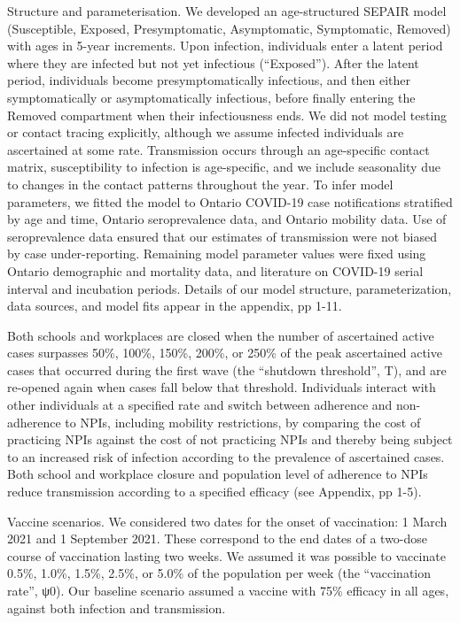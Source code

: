 Structure and parameterisation.  We developed an age-structured SEPAIR model (Susceptible, Exposed, Presymptomatic, Asymptomatic, Symptomatic, Removed) with ages in 5-year increments. Upon infection, individuals enter a latent period where they are infected but not yet infectious (“Exposed”).  After the latent period, individuals become presymptomatically infectious, and then either symptomatically or asymptomatically infectious, before finally entering the Removed compartment when their infectiousness ends. We did not model testing or contact tracing explicitly, although we assume infected individuals are ascertained at some rate. Transmission occurs through an age-specific contact matrix, susceptibility to infection is age-specific, and we include seasonality due to changes in the contact patterns throughout the year.  To infer model parameters, we fitted the model to Ontario COVID-19 case notifications stratified by age and time, Ontario seroprevalence data, and Ontario mobility data.  Use of seroprevalence data ensured that our estimates of transmission were not biased by case under-reporting. Remaining model parameter values were fixed using Ontario demographic and mortality data, and literature on COVID-19 serial interval and incubation periods.  Details of our model structure, parameterization, data sources, and model fits appear in the appendix, pp 1-11. 

Both schools and workplaces are closed when the number of ascertained active cases surpasses 50\%, 100\%, 150\%, 200\%, or 250\% of the peak ascertained active cases that occurred during the first wave (the “shutdown threshold”, T), and are re-opened again when cases fall below that threshold. Individuals interact with other individuals at a specified rate and switch between adherence and non-adherence to NPIs, including mobility restrictions, by comparing the cost of practicing NPIs against the cost of not practicing NPIs and thereby being subject to an increased risk of infection according to the prevalence of ascertained cases.  Both school and workplace closure and population level of adherence to NPIs reduce transmission according to a specified efficacy (see Appendix, pp 1-5). 

Vaccine scenarios. We considered two dates for the onset of vaccination: 1 March 2021 and 1 September 2021. These correspond to the end dates of a two-dose course of vaccination lasting two weeks. We assumed it was possible to vaccinate 0.5\%, 1.0\%, 1.5\%, 2.5\%, or 5.0\% of the population per week (the “vaccination rate”, ψ0).  Our baseline scenario assumed a vaccine with 75\% efficacy in all ages, against both infection and transmission.  

